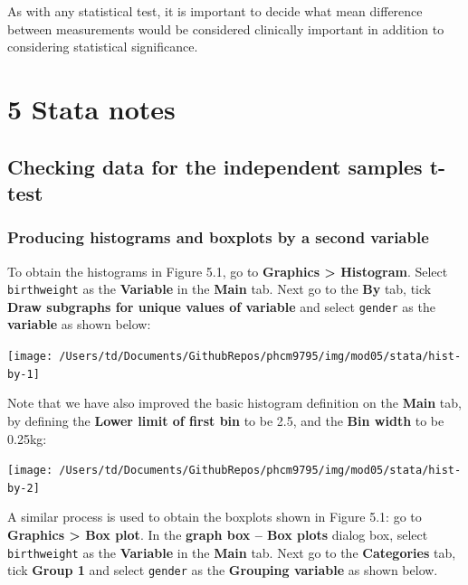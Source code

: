 \documentclass[
]{memoir}
\begin{document}
As with any statistical test, it is important to decide what mean difference between measurements would be considered clinically important in addition to considering statistical significance.

\hypertarget{stata-notes-1}{%
\chapter*{\texorpdfstring{\textbf{5} Stata notes}{5 Stata notes}}\label{stata-notes-1}}

\hypertarget{checking-data-for-the-independent-samples-t-test}{%
\section{Checking data for the independent samples t-test}\label{checking-data-for-the-independent-samples-t-test}}

\hypertarget{producing-histograms-and-boxplots-by-a-second-variable}{%
\subsection{Producing histograms and boxplots by a second variable}\label{producing-histograms-and-boxplots-by-a-second-variable}}

To obtain the histograms in Figure 5.1, go to \textbf{Graphics \textgreater{} Histogram}. Select \texttt{birthweight} as the \textbf{Variable} in the \textbf{Main} tab. Next go to the \textbf{By} tab, tick \textbf{Draw subgraphs for unique values of variable} and select \texttt{gender} as the \textbf{variable} as shown below:

\texttt{[image: /Users/td/Documents/GithubRepos/phcm9795/img/mod05/stata/hist-by-1]}

Note that we have also improved the basic histogram definition on the \textbf{Main} tab, by defining the \textbf{Lower limit of first bin} to be 2.5, and the \textbf{Bin width} to be 0.25kg:

\texttt{[image: /Users/td/Documents/GithubRepos/phcm9795/img/mod05/stata/hist-by-2]}

A similar process is used to obtain the boxplots shown in Figure 5.1: go to \textbf{Graphics \textgreater{} Box plot}. In the \textbf{graph box -- Box plots} dialog box, select \texttt{birthweight} as the \textbf{Variable} in the \textbf{Main} tab. Next go to the \textbf{Categories} tab, tick \textbf{Group 1} and select \texttt{gender} as the \textbf{Grouping variable} as shown below.
\end{document}
